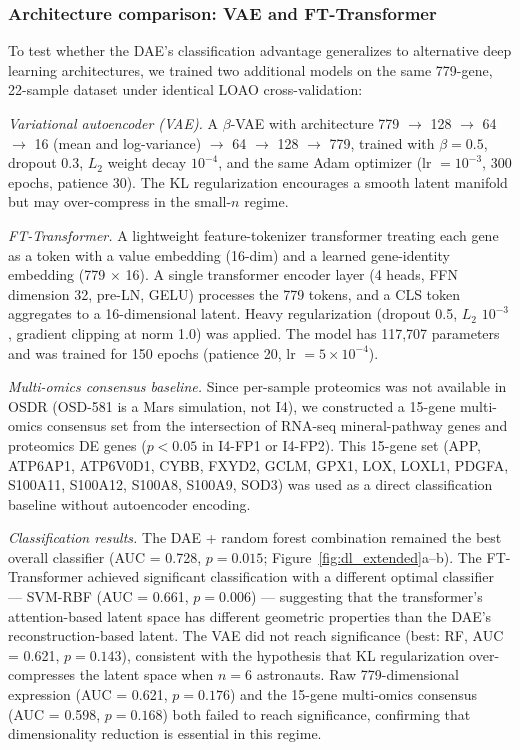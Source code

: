 \documentclass[11pt,a4paper]{article}
\begin{document}
\subsubsection{Architecture comparison: VAE and FT-Transformer}

To test whether the DAE's classification advantage generalizes to alternative deep learning architectures, we trained two additional models on the same 779-gene, 22-sample dataset under identical LOAO cross-validation:

\textit{Variational autoencoder (VAE).} A $\beta$-VAE with architecture 779 $\to$ 128 $\to$ 64 $\to$ 16 (mean and log-variance) $\to$ 64 $\to$ 128 $\to$ 779, trained with $\beta = 0.5$, dropout 0.3, $L_2$ weight decay $10^{-4}$, and the same Adam optimizer (lr $= 10^{-3}$, 300 epochs, patience 30). The KL regularization encourages a smooth latent manifold but may over-compress in the small-$n$ regime.

\textit{FT-Transformer.} A lightweight feature-tokenizer transformer treating each gene as a token with a value embedding (16-dim) and a learned gene-identity embedding (779 $\times$ 16). A single transformer encoder layer (4 heads, FFN dimension 32, pre-LN, GELU) processes the 779 tokens, and a CLS token aggregates to a 16-dimensional latent. Heavy regularization (dropout 0.5, $L_2$ $10^{-3}$, gradient clipping at norm 1.0) was applied. The model has 117,707 parameters and was trained for 150 epochs (patience 20, lr $= 5 \times 10^{-4}$).

\textit{Multi-omics consensus baseline.} Since per-sample proteomics was not available in OSDR (OSD-581 is a Mars simulation, not I4), we constructed a 15-gene multi-omics consensus set from the intersection of RNA-seq mineral-pathway genes and proteomics DE genes ($p < 0.05$ in I4-FP1 or I4-FP2). This 15-gene set (APP, ATP6AP1, ATP6V0D1, CYBB, FXYD2, GCLM, GPX1, LOX, LOXL1, PDGFA, S100A11, S100A12, S100A8, S100A9, SOD3) was used as a direct classification baseline without autoencoder encoding.

\textit{Classification results.} The DAE + random forest combination remained the best overall classifier (AUC = 0.728, $p = 0.015$; Figure~\ref{fig:dl_extended}a--b). The FT-Transformer achieved significant classification with a different optimal classifier --- SVM-RBF (AUC = 0.661, $p = 0.006$) --- suggesting that the transformer's attention-based latent space has different geometric properties than the DAE's reconstruction-based latent. The VAE did not reach significance (best: RF, AUC = 0.621, $p = 0.143$), consistent with the hypothesis that KL regularization over-compresses the latent space when $n = 6$ astronauts. Raw 779-dimensional expression (AUC = 0.621, $p = 0.176$) and the 15-gene multi-omics consensus (AUC = 0.598, $p = 0.168$) both failed to reach significance, confirming that dimensionality reduction is essential in this regime.
\end{document}
